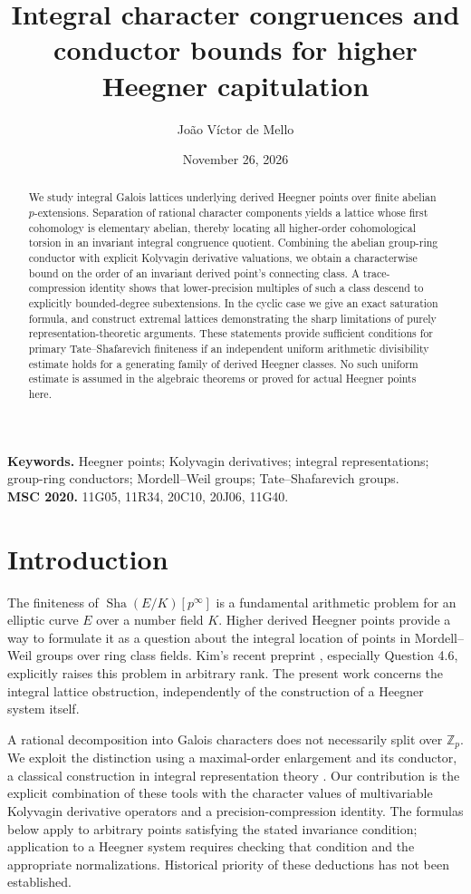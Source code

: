 \documentclass[11pt]{article}
\title{Integral character congruences and\\conductor bounds for higher Heegner capitulation}
\author{Jo\~ao V\'ictor de Mello}
\date{November 26, 2026}
\theoremstyle{definition}\newtheorem{definition}[theorem]{Definition}\newtheorem{example}[theorem]{Example}
\theoremstyle{remark}\newtheorem{remark}[theorem]{Remark}
\newcommand{\Zp}{\mathbb Z_p}\newcommand{\Qp}{\mathbb Q_p}\newcommand{\Fp}{\mathbb F_p}
\newcommand{\Sha}{\mathop{\mathrm{Sha}}}\newcommand{\Gal}{\operatorname{Gal}}\newcommand{\ord}{\operatorname{ord}}\newcommand{\Tr}{\operatorname{Tr}}\newcommand{\im}{\operatorname{im}}\newcommand{\rk}{\operatorname{rank}}
\begin{document}
\maketitle\thispagestyle{plain}
\begin{abstract}
We study integral Galois lattices underlying derived Heegner points over finite abelian $p$-extensions. Separation of rational character components yields a lattice whose first cohomology is elementary abelian, thereby locating all higher-order cohomological torsion in an invariant integral congruence quotient. Combining the abelian group-ring conductor with explicit Kolyvagin derivative valuations, we obtain a characterwise bound on the order of an invariant derived point's connecting class. A trace-compression identity shows that lower-precision multiples of such a class descend to explicitly bounded-degree subextensions. In the cyclic case we give an exact saturation formula, and construct extremal lattices demonstrating the sharp limitations of purely representation-theoretic arguments. These statements provide sufficient conditions for primary Tate--Shafarevich finiteness if an independent uniform arithmetic divisibility estimate holds for a generating family of derived Heegner classes. No such uniform estimate is assumed in the algebraic theorems or proved for actual Heegner points here.
\end{abstract}
\smallskip\noindent\textbf{Keywords.} Heegner points; Kolyvagin derivatives; integral representations; group-ring conductors; Mordell--Weil groups; Tate--Shafarevich groups.\\
\textbf{MSC 2020.} 11G05, 11R34, 20C10, 20J06, 11G40.

\section{Introduction}
The finiteness of $\Sha(E/K)[p^\infty]$ is a fundamental arithmetic problem for an elliptic curve $E$ over a number field $K$. Higher derived Heegner points provide a way to formulate it as a question about the integral location of points in Mordell--Weil groups over ring class fields. Kim's recent preprint \cite{kim}, especially Question 4.6, explicitly raises this problem in arbitrary rank. The present work concerns the integral lattice obstruction, independently of the construction of a Heegner system itself.

A rational decomposition into Galois characters does not necessarily split over $\Zp$. We exploit the distinction using a maximal-order enlargement and its conductor, a classical construction in integral representation theory \cite{nickel,adem}. Our contribution is the explicit combination of these tools with the character values of multivariable Kolyvagin derivative operators and a precision-compression identity. The formulas below apply to arbitrary points satisfying the stated invariance condition; application to a Heegner system requires checking that condition and the appropriate normalizations. Historical priority of these deductions has not been established.
\end{document}

